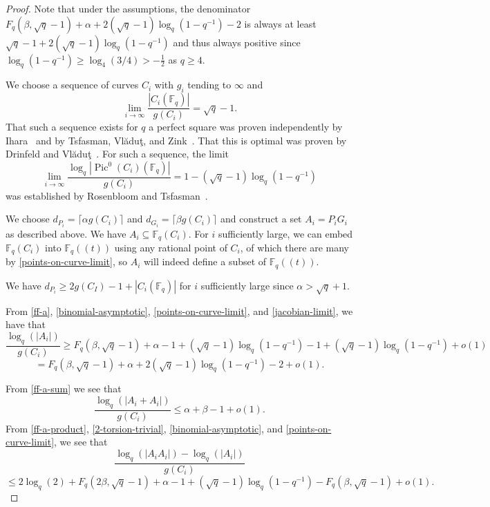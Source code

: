 \documentclass{amsart}
\numberwithin{equation}{section}
\begin{document}
 \begin{proof} Note that under the assumptions, the denominator $F_q(\beta, \sqrt{q}-1) + \alpha + 2(\sqrt{q}-1) \log_q (1- q^{-1}) -2 $ is always at least $\sqrt{q}-1 + 2(\sqrt{q}-1) \log_q(1-q^{-1})$ and thus always positive since $\log_q(1-q^{-1}) \geq \log_4(3/4) > -\frac{1}{2}$ as $q\geq 4$.
 
 We choose a sequence of curves $C_i$ with $g_i$ tending to $\infty$ and \begin{equation}\label{points-on-curve-limit}\lim_{i \to \infty} \frac{ |C_i(\mathbb F_q)|}{g(C_i)} = \sqrt{q}-1.\end{equation} That such a sequence exists for $q$ a perfect square was proven independently by Ihara~\cite{Ih82} and by Tsfasman, Vl\u{a}du\c{t}, and Zink~\cite{Tsfasman1982}. That this is optimal was proven by Drinfeld and Vl\u{a}du\c{t}~\cite{Vladut1983}.  For such a sequence, the limit
 \begin{equation}\label{jacobian-limit} \lim_{i \to \infty} \frac{\log_q  |\operatorname{Pic}^0(C_i)(\mathbb F_q)|}{g(C_i)} = 1- ( \sqrt{q}-1) \log_q (1- q^{-1})\end{equation}
 was established by Rosenbloom and Tsfasman~\cite[Lemma A.2]{Rosenbloom1990}.
 

 
 We choose $d_{P_i} = \lceil \alpha g(C_i) \rceil$ and $d_{G_i} = \lceil \beta g(C_i) \rceil$ and construct a set $A_i =P_iG_i$ as described above. We have $A_i \subseteq \mathbb F_q(C_i)$. For $i$ sufficiently large, we can embed $\mathbb F_q(C_i)$ into $\mathbb F_q((t))$ using any rational point of $C_i$, of which there are many by \eqref{points-on-curve-limit}, so $A_i$ will indeed define a subset of $\mathbb F_q((t))$.
 
 We have $d_{P_i} \geq 2g(C_I)-1+ |C_i(\mathbb F_q)| $ for $i$ sufficiently large since  $\alpha> \sqrt{q}+1$.
 
 From \eqref{ff-a}, \eqref{binomial-asymptotic}, \eqref{points-on-curve-limit}, and \eqref{jacobian-limit}, we have that
\[ \frac{ \log_q( |A_i|)}{g(C_i)} \geq  F_q(\beta, \sqrt{q}-1) + \alpha -1 + (\sqrt{q}-1) \log_q (1- q^{-1})  - 1 + (\sqrt{q}-1) \log_q(1-q^{-1})+o(1) \] \[= F_q(\beta, \sqrt{q}-1) + \alpha +2(\sqrt{q}-1) \log_q (1- q^{-1}) -2+o(1) .  \]

From \eqref{ff-a-sum} we see that
\[ \frac{\log_q( |A_i+A_i|)}{g(C_i)} \leq \alpha + \beta -1+o(1). \]
From \eqref{ff-a-product}, \eqref{2-torsion-trivial}, \eqref{binomial-asymptotic}, and \eqref{points-on-curve-limit}, we see that
\[ \frac{\log_q( |A_iA_i|) -\log_q(|A_i|)}{g(C_i)} \] \[\leq 2 \log_q(2) + F_q(2\beta, \sqrt{q}-1) + \alpha -1 +  (\sqrt{q}-1) \log_q(1-q^{-1})  - F_q(\beta, \sqrt{q}-1)+o(1).\]


\end{proof}
\end{document}
